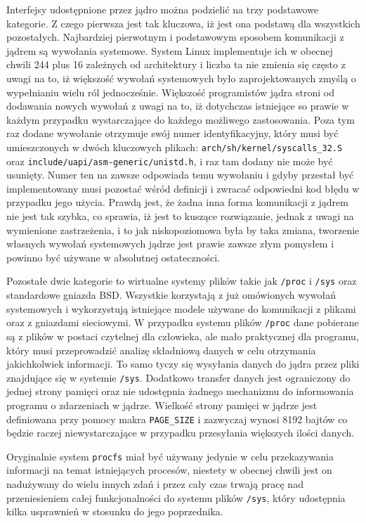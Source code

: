 \documentclass[11pt]{scrartcl}
\begin{document}
Interfejsy udostępnione przez jądro można podzielić na trzy podstawowe kategorie. Z czego pierwsza jest tak kluczowa, iż jest ona podstawą dla wszystkich pozostałych. Najbardziej pierwotnym i podstawowym sposobem komunikacji z jądrem są wywołania systemowe. System Linux implementuje ich w obecnej chwili 244 plus 16 zależnych od architektury i liczba ta nie zmienia się często z uwagi na to, iż większość wywołań systemowych było zaprojektowanych zmyślą o wypełnianiu wielu ról jednocześnie.  Większość programistów jądra stroni od dodawania nowych wywołań z uwagi na to, iż dotychczas istniejące so prawie w każdym przypadku wystarczające do każdego możliwego zastosowania. Poza tym raz dodane wywołanie otrzymuje swój numer identyfikacyjny, który musi być umieszczonych w dwóch kluczowych plikach: \texttt{arch/sh/kernel/syscalls\_32.S} oraz \texttt{include/uapi/asm-generic/unistd.h}, i raz tam dodany nie może być usunięty. Numer ten na zawsze odpowiada temu wywołaniu i gdyby przestał być implementowany musi pozostać wśród definicji i zwracać odpowiedni kod błędu w przypadku jego użycia. Prawdą jest, że żadna inna forma komunikacji z jądrem nie jest tak szybka, co sprawia, iż jest to kuszące rozwiązanie, jednak z uwagi na wymienione zastrzeżenia, i to jak niskopoziomowa była by taka zmiana, tworzenie własnych wywołań systemowych jądrze jest prawie zawsze złym pomysłem i powinno być używane w absolutnej ostateczności.

Pozostałe dwie kategorie to wirtualne systemy plików takie jak \texttt{/proc} i \texttt{/sys} oraz standardowe gniazda BSD\@. Wszystkie korzystają z już omówionych wywołań systemowych i wykorzystują istniejące modele używane do komunikacji z plikami oraz z gniazdami sieciowymi. W przypadku systemu plików \texttt{/proc} dane pobierane są z plików w postaci czytelnej dla człowieka, ale mało praktycznej dla programu, który musi przeprowadzić analizę składniową danych w celu otrzymania jakichkolwiek informacji. To samo tyczy się wysyłania danych do jądra przez pliki znajdujące się w systemie \texttt{/sys}. Dodatkowo transfer danych jest ograniczony do jednej strony pamięci oraz nie udostępnia żadnego mechanizmu do informowania programu o zdarzeniach w jądrze. Wielkość strony pamięci w jądrze jest definiowana przy pomocy makra \texttt{PAGE\_SIZE} i zazwyczaj wynosi 8192 bajtów co będzie raczej niewystarczające w przypadku przesyłania większych ilości danych.

Oryginalnie system \texttt{procfs} miał być używany jedynie w celu przekazywania informacji na temat istniejących procesów, niestety w obecnej chwili jest on nadużywany do wielu innych zdań i przez cały czas trwają pracę nad przeniesieniem całej funkcjonalności do systemu plików \texttt{/sys}, który udostępnia kilka usprawnień w stosunku do jego poprzednika.
\end{document}
